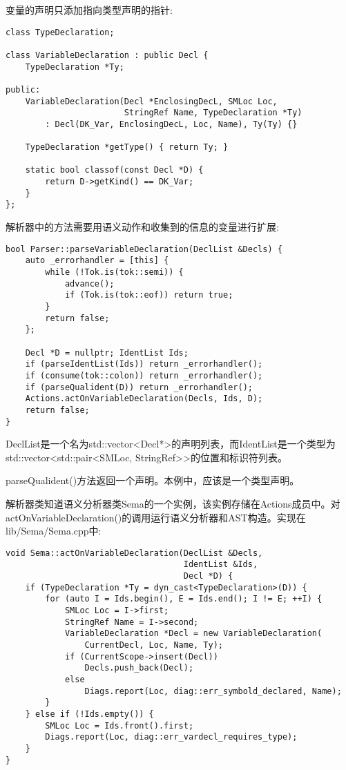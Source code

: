 变量的声明只添加指向类型声明的指针:\par

\begin{lstlisting}[caption={}]
class TypeDeclaration;

class VariableDeclaration : public Decl {
	TypeDeclaration *Ty;
	
public:
	VariableDeclaration(Decl *EnclosingDecL, SMLoc Loc,
						StringRef Name, TypeDeclaration *Ty)
		: Decl(DK_Var, EnclosingDecL, Loc, Name), Ty(Ty) {}
	
	TypeDeclaration *getType() { return Ty; }
	
	static bool classof(const Decl *D) {
		return D->getKind() == DK_Var;
	}
};
\end{lstlisting}

解析器中的方法需要用语义动作和收集到的信息的变量进行扩展:\par

\begin{lstlisting}[caption={}]
bool Parser::parseVariableDeclaration(DeclList &Decls) {
	auto _errorhandler = [this] {
		while (!Tok.is(tok::semi)) {
			advance();
			if (Tok.is(tok::eof)) return true;
		}
		return false;
	};

	Decl *D = nullptr; IdentList Ids;
	if (parseIdentList(Ids)) return _errorhandler();
	if (consume(tok::colon)) return _errorhandler();
	if (parseQualident(D)) return _errorhandler();
	Actions.actOnVariableDeclaration(Decls, Ids, D);
	return false;
}
\end{lstlisting}

DeclList是一个名为std::vector<Decl*>的声明列表，而IdentList是一个类型为std::vector<\allowbreak std::pair<SMLoc, StringRef>>的位置和标识符列表。\par

parseQualident()方法返回一个声明。本例中，应该是一个类型声明。\par

解析器类知道语义分析器类Sema的一个实例，该实例存储在Actions成员中。对actOnVariable\allowbreak Declaration()的调用运行语义分析器和AST构造。实现在lib/Sema/Sema.cpp中:\par

\begin{lstlisting}[caption={}]
void Sema::actOnVariableDeclaration(DeclList &Decls,
									IdentList &Ids,
									Decl *D) {
	if (TypeDeclaration *Ty = dyn_cast<TypeDeclaration>(D)) {
		for (auto I = Ids.begin(), E = Ids.end(); I != E; ++I) {
			SMLoc Loc = I->first;
			StringRef Name = I->second;
			VariableDeclaration *Decl = new VariableDeclaration(
				CurrentDecl, Loc, Name, Ty);
			if (CurrentScope->insert(Decl))
				Decls.push_back(Decl);
			else
				Diags.report(Loc, diag::err_symbold_declared, Name);
		}
	} else if (!Ids.empty()) {
		SMLoc Loc = Ids.front().first;
		Diags.report(Loc, diag::err_vardecl_requires_type);
	}
}
\end{lstlisting}

